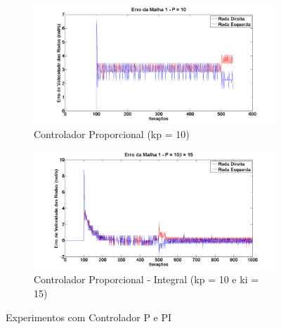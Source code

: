 \begin{figure}[!htb]
	\centering
	\begin{subfigure}{1.0\textwidth}
		\centering
		\includegraphics[width=.9\linewidth]{./Testes/Malha1/PID/m1_kp10}
		\caption{Controlador Proporcional (kp = 10)}
		\label{fig:contP}
	\end{subfigure}
	\begin{subfigure}{1.0\textwidth}
		\centering
		\includegraphics[width=.9\linewidth]{./Testes/Malha1/PID/m1_kp10ki15}
		\caption{Controlador Proporcional - Integral (kp = 10 e ki = 15)}
		\label{fig:contPI1}
	\end{subfigure}
	\caption{Experimentos com Controlador P e PI}
	\label{fig:contP}
\end{figure}
